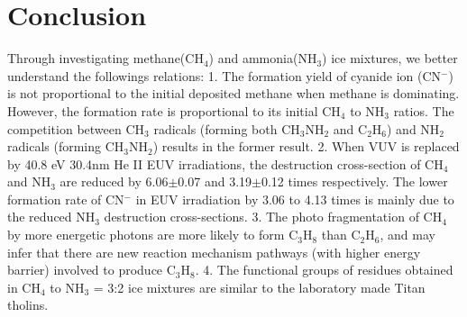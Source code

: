 \section{Conclusion}
Through investigating methane(CH$_4$) and ammonia(NH$_3$) ice mixtures, we better understand the followings relations: 1. The formation yield of cyanide ion (CN$^-$) is not proportional to the initial deposited methane when methane is dominating. However, the formation rate is proportional to its initial CH$_4$ to NH$_3$ ratios. The competition between CH$_3$ radicals (forming both CH$_3$NH$_2$ and C$_2$H$_6$) and NH$_2$ radicals (forming CH$_3$NH$_2$) results in the former result. 2. When VUV is replaced by 40.8 eV 30.4nm He II EUV irradiations, the destruction cross-section of CH$_4$ and NH$_3$ are reduced by  6.06$\pm$0.07 and 3.19$\pm$0.12 times respectively. The lower formation rate of CN$^-$ in EUV irradiation by 3.06 to 4.13 times is mainly due to the reduced NH$_3$ destruction cross-sections. 3. The photo fragmentation of CH$_4$ by more energetic photons are more likely to form C$_3$H$_8$ than C$_2$H$_6$, and may infer that there are new reaction mechanism pathways (with higher energy barrier) involved to produce C$_3$H$_8$. 4. The functional groups of residues obtained in CH$_4$ to NH$_3$ = 3:2 ice mixtures are similar to the laboratory made Titan tholins.

